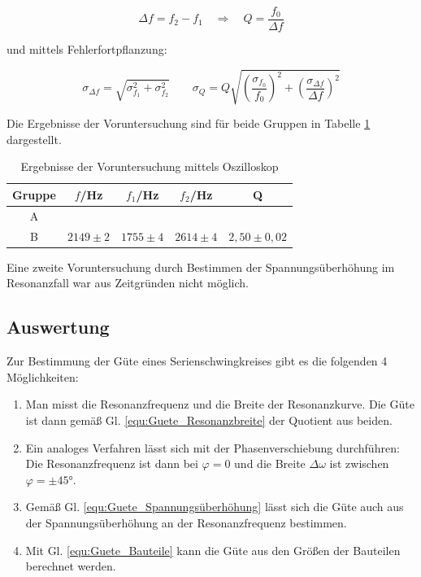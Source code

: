 \documentclass[12pt,a4paper]{article}
\begin{document}
\begin{equation}
\Delta f = f_2 - f_1 \quad \Rightarrow \quad Q = \frac{f_0}{\Delta f}
\end{equation}

und mittels Fehlerfortpflanzung:

\begin{equation}
\sigma_{\Delta f} = \sqrt{\sigma_{f_1}^2+\sigma_{f_2}^2} \qquad \sigma_Q = Q \sqrt{(\frac{\sigma_{f_0}}{f_0})^2 + (\frac{\sigma_{\Delta f}}{\Delta f})^2}
\end{equation}

Die Ergebnisse der Voruntersuchung sind für beide Gruppen in Tabelle \ref{tab:Voruntersuchung} dargestellt.

\begin{table}
\centering
\begin{tabular}{|c|c|c|c|c|}
\hline
Gruppe & $f$/Hz & $f_1$/Hz & $f_2$/Hz & Q\\
\hline
A & & & &\\
\hline
B & $2149 \pm 2$ & $1755 \pm 4$ & $2614 \pm 4$ & $2,50 \pm 0,02$\\
\hline
\end{tabular}
\caption{Ergebnisse der Voruntersuchung mittels Oszilloskop}
\label{tab:Voruntersuchung}
\end{table}


Eine zweite Voruntersuchung durch Bestimmen der Spannungsüberhöhung im Resonanzfall war aus Zeitgründen nicht möglich.

\subsection{Auswertung}
Zur Bestimmung der Güte eines Serienschwingkreises gibt es die folgenden 4 Möglichkeiten:
\begin{enumerate}
\item Man misst die Resonanzfrequenz und die Breite der Resonanzkurve. Die Güte ist dann gemäß Gl. \ref{equ:Guete_Resonanzbreite} der Quotient aus beiden.
\item Ein analoges Verfahren lässt sich mit der Phasenverschiebung durchführen: Die Resonanzfrequenz ist dann bei $\varphi = 0$ und die Breite $\Delta \omega$ ist zwischen $\varphi = \pm \ang{45}$.
\item Gemäß Gl. \ref{equ:Guete_Spannungsüberhöhung} lässt sich die Güte auch aus der Spannungsüberhöhung an der Resonanzfrequenz bestimmen.
\item Mit Gl. \ref{equ:Guete_Bauteile} kann die Güte aus den Größen der Bauteilen berechnet werden.
\end{enumerate}
\end{document}
